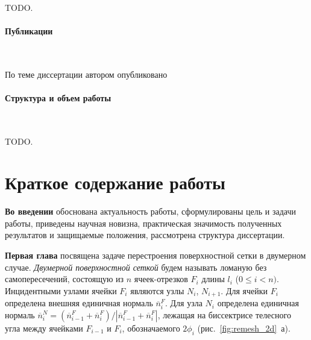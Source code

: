 \documentclass[a4paper,14pt]{extarticle}                     %
\theoremstyle{plain}                                         %
\begin{document}
\

TODO.

\paragraph{Публикации} 

\

По теме диссертации автором опубликовано 

\paragraph{Структура и объем работы} 

\

TODO.


\newpage
\section*{Краткое содержание работы}

\textbf{Во введении} обоснована актуальность работы, сформулированы цель и задачи работы, приведены научная новизна, практическая значимость полученных результатов и защищаемые положения, рассмотрена структура диссертации. 


\textbf{Первая глава} посвящена задаче перестроения поверхностной сетки в двумерном случае.
\textit{Двумерной поверхностной сеткой} будем называть ломаную без самопересечений, состоящую из $n$ ячеек-отрезков $F_i$ длины $l_i$ ($0 \le i < n)$. Инцидентными узлами ячейки $F_i$ являются узлы $N_i$, $N_{i + 1}$. Для ячейки $F_i$ определена внешняя единичная нормаль $\overline{n}_i^F$.
Для узла $N_i$ определена единичная нормаль $\overline{n}_i^N = (\overline{n}_{i-1}^F + \overline{n}_i^F) / |\overline{n}_{i-1}^F + \overline{n}_i^F|$, лежащая на биссектрисе телесного угла между ячейками $F_{i - 1}$ и $F_i$, обозначаемого $2 \phi_i$ (рис.~\ref{fig:remesh_2d}~а).
\end{document}
